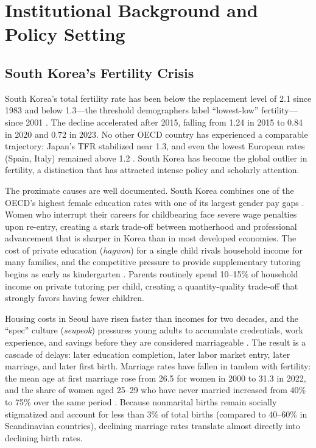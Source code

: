 \documentclass[12pt]{article}
\begin{document}
\section{Institutional Background and Policy Setting}

\subsection{South Korea's Fertility Crisis}

South Korea's total fertility rate has been below the replacement level of 2.1 since 1983 and below 1.3---the threshold demographers label ``lowest-low'' fertility---since 2001 \citep{kohler2002emergence}. The decline accelerated after 2015, falling from 1.24 in 2015 to 0.84 in 2020 and 0.72 in 2023. No other OECD country has experienced a comparable trajectory: Japan's TFR stabilized near 1.3, and even the lowest European rates (Spain, Italy) remained above 1.2 \citep{un2022world}. South Korea has become the global outlier in fertility, a distinction that has attracted intense policy and scholarly attention.

The proximate causes are well documented. South Korea combines one of the OECD's highest female education rates with one of its largest gender pay gaps \citep{oecd2023gender}. Women who interrupt their careers for childbearing face severe wage penalties upon re-entry, creating a stark trade-off between motherhood and professional advancement that is sharper in Korea than in most developed economies. The cost of private education (\textit{hagwon}) for a single child rivals household income for many families, and the competitive pressure to provide supplementary tutoring begins as early as kindergarten \citep{seth2012education}. Parents routinely spend 10--15\% of household income on private tutoring per child, creating a quantity-quality trade-off that strongly favors having fewer children.

Housing costs in Seoul have risen faster than incomes for two decades, and the ``spec'' culture (\textit{seupeok}) pressures young adults to accumulate credentials, work experience, and savings before they are considered marriageable \citep{park2021housing}. The result is a cascade of delays: later education completion, later labor market entry, later marriage, and later first birth. Marriage rates have fallen in tandem with fertility: the mean age at first marriage rose from 26.5 for women in 2000 to 31.3 in 2022, and the share of women aged 25--29 who have never married increased from 40\% to 75\% over the same period \citep{kostat2023vital}. Because nonmarital births remain socially stigmatized and account for less than 3\% of total births (compared to 40--60\% in Scandinavian countries), declining marriage rates translate almost directly into declining birth rates.
\end{document}
